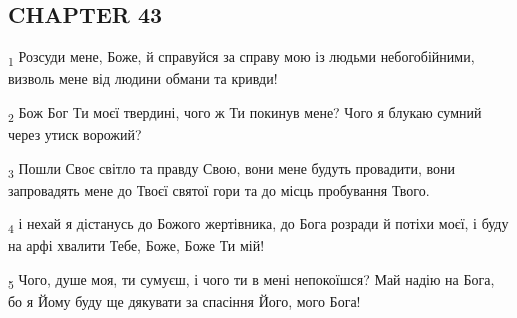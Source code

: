 \subsection{CHAPTER 43}
\begin{tcolorbox}
\textsubscript{1} Розсуди мене, Боже, й справуйся за справу мою із людьми небогобійними, визволь мене від людини обмани та кривди!
\end{tcolorbox}
\begin{tcolorbox}
\textsubscript{2} Бож Бог Ти моєї твердині, чого ж Ти покинув мене? Чого я блукаю сумний через утиск ворожий?
\end{tcolorbox}
\begin{tcolorbox}
\textsubscript{3} Пошли Своє світло та правду Свою, вони мене будуть провадити, вони запровадять мене до Твоєї святої гори та до місць пробування Твого.
\end{tcolorbox}
\begin{tcolorbox}
\textsubscript{4} і нехай я дістанусь до Божого жертівника, до Бога розради й потіхи моєї, і буду на арфі хвалити Тебе, Боже, Боже Ти мій!
\end{tcolorbox}
\begin{tcolorbox}
\textsubscript{5} Чого, душе моя, ти сумуєш, і чого ти в мені непокоїшся? Май надію на Бога, бо я Йому буду ще дякувати за спасіння Його, мого Бога!
\end{tcolorbox}
